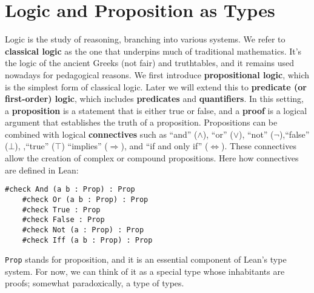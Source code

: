 \section{Logic and Proposition as Types}

Logic is the study of reasoning, branching into various systems.
We refer to \textbf{classical logic} as the one that underpins much
of traditional mathematics.
It's the logic of the ancient Greeks (not fair) and truthtables, and it remains
used nowadays for pedagogical reasons.
We first introduce \textbf{propositional logic}, which is the simplest
form of classical logic.
Later we will extend this to \textbf{predicate (or first-order) logic}, which includes
\textbf{predicates} and \textbf{quantifiers}.
In this setting, a \textbf{proposition} is a statement that is either true or false,
and a \textbf{proof} is a logical argument that establishes the truth of a
proposition.
Propositions can be combined with logical \textbf{connectives} such as ``and'' ($\wedge$),
``or'' ($\vee$), ``not'' ($\neg$),``false'' ($\bot$), ,``true'' ($\top$) ``implies'' ($\Rightarrow$),  and ``if and only if'' ($\Leftrightarrow$).
These connectives allow the creation of complex or compound propositions.
\newpage
Here how connectives are defined in Lean:
\begin{example}\mbox{}
  \begin{lstlisting}[language=lean]
    #check And (a b : Prop) : Prop
    #check Or (a b : Prop) : Prop
    #check True : Prop
    #check False : Prop
    #check Not (a : Prop) : Prop
    #check Iff (a b : Prop) : Prop
  \end{lstlisting}
  \lstinline[language=lean]|Prop| stands for proposition, and it is an
  essential component of Lean’s type system.
  For now, we can think of it as a special type whose
  inhabitants are proofs; somewhat
  paradoxically, a type of types.
\end{example}


